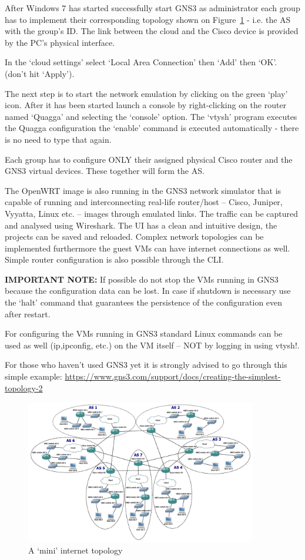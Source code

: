 \documentclass[a4paper]{article}
\begin{document}
After Windows 7 has started successfully start GNS3 as administrator each group has to implement their corresponding topology shown on Figure~\ref{fig:mini-internet} - i.e. the AS with the group's ID. The link between the cloud and the Cisco device is provided by the PC's physical interface.

In the `cloud settings' select `Local Area Connection' then `Add' then `OK'. (don't hit `Apply').

The next step is to start the network emulation by clicking on the green `play' icon. After it has been started launch a console by right-clicking on the router named `Quagga' and selecting the `console' option. The `vtysh' program executes the Quagga configuration the `enable' command is executed automatically - there is no need to type that again.

Each group has to configure ONLY their assigned physical Cisco router and the GNS3 virtual devices. These together will form the AS.

The OpenWRT image is also running in the GNS3 network simulator that is capable of running and interconnecting real-life router/host -- Cisco, Juniper, Vyyatta, Linux etc. -- images through emulated links. The traffic can be captured and analysed using Wireshark. The UI has a clean and intuitive design, the projects can be saved and reloaded. Complex network topologies can be implemented furthermore the guest VMs can have internet connections as well. Simple router configuration is also possible through the CLI.

\textbf{IMPORTANT NOTE:} If possible do not stop the VMs running in GNS3 because the configuration data can be lost. In case if shutdown is necessary use the `halt' command that guarantees the persistence of the configuration even after restart.

For configuring the VMs running in GNS3 standard Linux commands can be used as well (ip,ipconfig, etc.) on the VM itself --  NOT by logging in using vtysh!.

For those who haven't used GNS3 yet it is strongly advised to go through this simple example:
\url{https://www.gns3.com/support/docs/creating-the-simplest-topology-2}

\begin{figure}[H]
    \centering
    \includegraphics[width=0.9\textwidth]{figures/mini_internet.png}
    \caption{A `mini' internet topology}
    \label{fig:mini-internet}
\end{figure}
\end{document}
